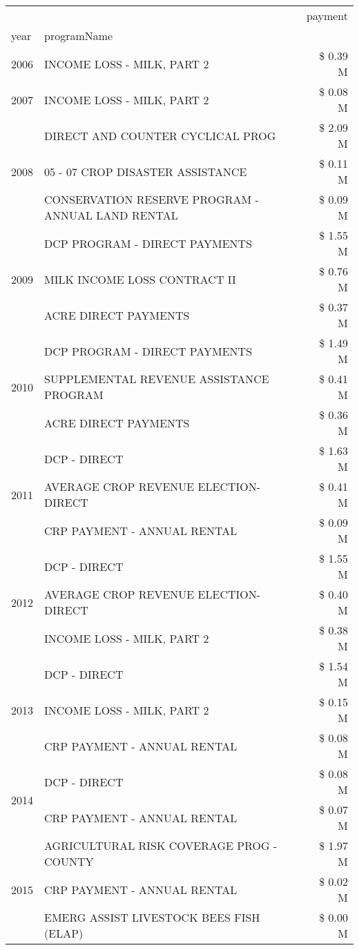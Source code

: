 \begin{tabular}{llr}
\toprule
 &  & payment \\
year & programName &  \\
\midrule
2006 & INCOME LOSS - MILK, PART 2 & \$ 0.39 M \\
\cline{1-3}
2007 & INCOME LOSS - MILK, PART 2 & \$ 0.08 M \\
\cline{1-3}
\multirow[t]{3}{*}{2008} & DIRECT AND COUNTER CYCLICAL PROG & \$ 2.09 M \\
 & 05 - 07 CROP DISASTER ASSISTANCE & \$ 0.11 M \\
 & CONSERVATION RESERVE PROGRAM - ANNUAL LAND RENTAL & \$ 0.09 M \\
\cline{1-3}
\multirow[t]{3}{*}{2009} & DCP PROGRAM - DIRECT PAYMENTS & \$ 1.55 M \\
 & MILK INCOME LOSS CONTRACT II & \$ 0.76 M \\
 & ACRE DIRECT PAYMENTS & \$ 0.37 M \\
\cline{1-3}
\multirow[t]{3}{*}{2010} & DCP PROGRAM - DIRECT PAYMENTS & \$ 1.49 M \\
 & SUPPLEMENTAL REVENUE ASSISTANCE PROGRAM & \$ 0.41 M \\
 & ACRE DIRECT PAYMENTS & \$ 0.36 M \\
\cline{1-3}
\multirow[t]{3}{*}{2011} & DCP - DIRECT & \$ 1.63 M \\
 & AVERAGE CROP REVENUE ELECTION-DIRECT & \$ 0.41 M \\
 & CRP PAYMENT - ANNUAL RENTAL & \$ 0.09 M \\
\cline{1-3}
\multirow[t]{3}{*}{2012} & DCP - DIRECT & \$ 1.55 M \\
 & AVERAGE CROP REVENUE ELECTION-DIRECT & \$ 0.40 M \\
 & INCOME LOSS - MILK, PART 2 & \$ 0.38 M \\
\cline{1-3}
\multirow[t]{3}{*}{2013} & DCP - DIRECT & \$ 1.54 M \\
 & INCOME LOSS - MILK, PART 2 & \$ 0.15 M \\
 & CRP PAYMENT - ANNUAL RENTAL & \$ 0.08 M \\
\cline{1-3}
\multirow[t]{2}{*}{2014} & DCP - DIRECT & \$ 0.08 M \\
 & CRP PAYMENT - ANNUAL RENTAL & \$ 0.07 M \\
\cline{1-3}
\multirow[t]{3}{*}{2015} & AGRICULTURAL RISK COVERAGE PROG - COUNTY & \$ 1.97 M \\
 & CRP PAYMENT - ANNUAL RENTAL & \$ 0.02 M \\
 & EMERG ASSIST LIVESTOCK BEES FISH (ELAP) & \$ 0.00 M \\

\end{tabular}
